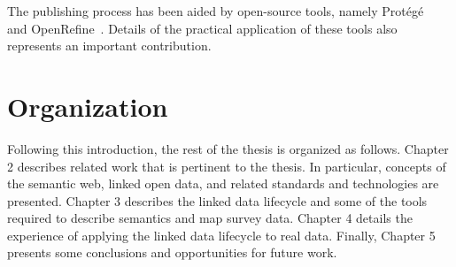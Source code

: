 \begin{doublespace}
The publishing process has been aided by open-source tools,
namely Protégé~\cite{billey2019foundations} and OpenRefine~\cite{fiorelli2021lifting}.
Details of the practical application of these tools also represents an important contribution.

\section{Organization}
\label{sec:organization}

Following this introduction, 
the rest of the thesis is organized as follows. 
Chapter 2 describes related work that is pertinent to the thesis. 
In particular, 
concepts of the semantic web, linked open data, and related standards and technologies 
are presented. 
Chapter 3 describes the linked data lifecycle and some of the tools
required to describe semantics and map survey data. 
Chapter 4 details the experience of applying the linked data lifecycle to real data.
Finally, Chapter 5 presents some conclusions and opportunities for future work.

\end{doublespace}
